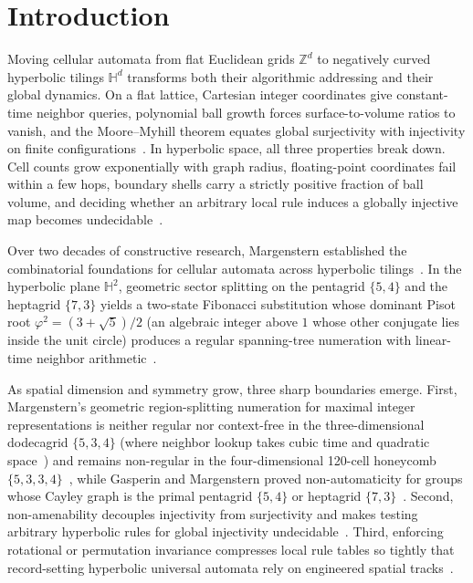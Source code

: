 \section{Introduction}
\label{sec:introduction}

Moving cellular automata from flat Euclidean grids $\mathbb{Z}^d$ to negatively curved hyperbolic tilings $\mathbb{H}^d$ transforms both their algorithmic addressing and their global dynamics. On a flat lattice, Cartesian integer coordinates give constant-time neighbor queries, polynomial ball growth forces surface-to-volume ratios to vanish, and the Moore--Myhill theorem equates global surjectivity with injectivity on finite configurations~\cite{moore1962,myhill1963}. In hyperbolic space, all three properties break down. Cell counts grow exponentially with graph radius, floating-point coordinates fail within a few hops, boundary shells carry a strictly positive fraction of ball volume, and deciding whether an arbitrary local rule induces a globally injective map becomes undecidable~\cite{margenstern2007hedlund,margenstern2008injectivity,bartholdi2010}.

Over two decades of constructive research, Margenstern established the combinatorial foundations for cellular automata across hyperbolic tilings~\cite{margenstern2007vol1,margenstern2008vol2}. In the hyperbolic plane $\mathbb{H}^2$, geometric sector splitting on the pentagrid $\{5,4\}$ and the heptagrid $\{7,3\}$ yields a two-state Fibonacci substitution whose dominant Pisot root $\varphi^2 = (3+\sqrt{5})/2$ (an algebraic integer above $1$ whose other conjugate lies inside the unit circle) produces a regular spanning-tree numeration with linear-time neighbor arithmetic~\cite{margenstern2006substitution,margenstern2016coords,margenstern2019fib1}.

As spatial dimension and symmetry grow, three sharp boundaries emerge. First, Margenstern's geometric region-splitting numeration for maximal integer representations is neither regular nor context-free in the three-dimensional dodecagrid $\{5,3,4\}$ (where neighbor lookup takes cubic time and quadratic space~\cite{margenstern2003skordev}) and remains non-regular in the four-dimensional 120-cell honeycomb $\{5,3,3,4\}$~\cite{margenstern2004fourd,margenstern2007vol1}, while Gasperin and Margenstern proved non-automaticity for groups whose Cayley graph is the primal pentagrid $\{5,4\}$ or heptagrid $\{7,3\}$~\cite{margenstern2014gasperin}. Second, non-amenability decouples injectivity from surjectivity and makes testing arbitrary hyperbolic rules for global injectivity undecidable~\cite{margenstern2008injectivity}. Third, enforcing rotational or permutation invariance compresses local rule tables so tightly that record-setting hyperbolic universal automata rely on engineered spatial tracks~\cite{margenstern2021dodecagrid,margenstern2021outer,margenstern2023weighted,margenstern2024heptagrid}.

